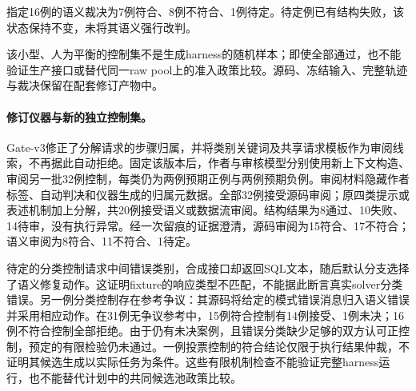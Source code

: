 指定16例的语义裁决为7例符合、8例不符合、1例待定。待定例已有结构失败，该状态保持不变，未将其语义强行改判。

该小型、人为平衡的控制集不是生成harness的随机样本；即使全部通过，也不能验证生产接口或替代同一raw pool上的准入政策比较。源码、冻结输入、完整轨迹与裁决保留在配套修订产物中。

\paragraph{修订仪器与新的独立控制集。}
Gate-v3修正了分解请求的步骤归属，并将类别关键词及共享请求模板作为审阅线索，不再据此自动拒绝。固定该版本后，作者与审核模型分别使用新上下文构造、审阅另一批32例控制，每类仍为两例预期正例与两例预期负例。审阅材料隐藏作者标签、自动判决和仪器生成的归属元数据。全部32例接受源码审阅；原四类提示或表述机制加上分解，共20例接受语义或数据流审阅。结构结果为8通过、10失败、14待审，没有执行异常。经一次留痕的证据澄清，源码审阅为15符合、17不符合；语义审阅为8符合、11不符合、1待定。

待定的分类控制请求中间错误类别，合成接口却返回SQL文本，随后默认分支选择了语义修复动作。这证明fixture的响应类型不匹配，不能据此断言真实solver分类错误。另一例分类控制存在参考争议：其源码将给定的模式错误消息归入语义错误并采用相应动作。在31例无争议参考中，15例符合控制有14例接受、1例未决；16例不符合控制全部拒绝。由于仍有未决案例，且错误分类缺少足够的双方认可正控制，预定的有限检验仍未通过。一例投票控制的符合结论仅限于执行结果仲裁，不证明其候选生成以实际任务为条件。这些有限机制检查不能验证完整harness运行，也不能替代计划中的共同候选池政策比较。
